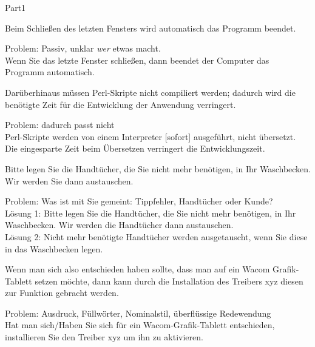\documentclass[a4paper,twoside]{article}
\newcommand{\gquote}[1]{\glqq #1\grqq}
\begin{document}
\begin{exam}[Teil I.]{Part1}
\begin{problem}[3]
Beim Schließen des letzten Fensters wird automatisch das Programm beendet.
\begin{solution}
Problem: Passiv, unklar \emph{wer} etwas macht.\\
Wenn Sie das letzte Fenster schließen, dann beendet der Computer das
Programm automatisch.
\end{solution}
\end{problem}

\begin{problem}[3]
Darüberhinaus müssen Perl-Skripte nicht compiliert werden; dadurch wird die 
benötigte Zeit für die Entwicklung der Anwendung verringert.
\begin{solution}
Problem: \gquote{dadurch} passt nicht\\
Perl-Skripte werden von einem Interpreter [sofort] ausgeführt, nicht übersetzt. 
Die eingesparte Zeit beim Übersetzen verringert die Entwicklungszeit.
\end{solution}
\end{problem}

\begin{problem}[3]
Bitte legen Sie die Handtücher, die Sie nicht mehr benötigen, in Ihr Waschbecken.
Wir werden Sie dann austauschen.
\begin{solution}
Problem: Was ist mit \gquote{Sie} gemeint: Tippfehler, Handtücher oder Kunde?\\
Lösung 1: Bitte legen Sie die Handtücher, die Sie nicht mehr benötigen, in Ihr Waschbecken.
Wir werden die Handtücher dann austauschen.\\
Lösung 2: Nicht mehr benötigte Handtücher werden ausgetauscht, wenn Sie diese
in das Waschbecken legen.
\end{solution}
\end{problem}

\begin{problem}[3]
Wenn man sich also entschieden haben sollte, dass man auf ein Wacom Grafik-Tablett
setzen möchte, dann kann durch die Installation des Treibers xyz diesen
zur Funktion gebracht werden.
\begin{solution}
Problem: Ausdruck, Füllwörter, Nominalstil, überflüssige Redewendung\\
Hat man sich/Haben Sie sich für ein Wacom-Grafik-Tablett entschieden, installieren
Sie den Treiber xyz um ihn zu aktivieren.
\end{solution}
\end{problem}


\end{exam}
\end{document}
